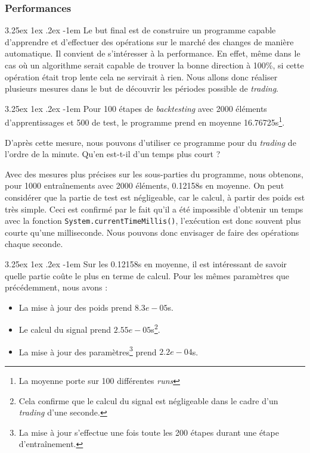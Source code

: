 \documentclass[a4paper, 11pt]{article}
\makeatletter
\renewcommand\paragraph{\@startsection{paragraph}{5}{\z@}%
  {3.25ex \@plus1ex \@minus.2ex}%
  {-1em}%
  {\normalfont\normalsize\bfseries}}
\makeatother
\begin{document}
\subsubsection{Performances}
\paragraph{}
Le but final est de construire un programme capable d'apprendre et d'effectuer des opérations sur le marché des changes de manière automatique. Il convient de s'intéresser à la performance. En effet, même dans le cas où un algorithme serait capable de trouver la bonne direction à 100\%, si cette opération était trop lente cela ne servirait à rien. Nous allons donc réaliser plusieurs mesures dans le but de découvrir les périodes possible de \textit{trading}.

\paragraph{}
Pour 100 étapes de \textit{backtesting} avec 2000 éléments d'apprentissages et 500 de test, le programme prend en moyenne 16.76725s\footnote{La moyenne porte sur 100 différentes \textit{runs}}.

D'après cette mesure,  nous pouvons d'utiliser ce programme pour du \textit{trading} de l'ordre de la minute. Qu'en est-t-il d'un temps plus court ?

Avec des mesures plus précises sur les sous-parties du programme, nous obtenons, pour 1000 entraînements avec 2000 éléments, 0.12158s en moyenne. On peut considérer que la partie de test est négligeable, car le calcul, à partir des poids est très simple. Ceci est confirmé par le fait qu'il a été impossible d'obtenir un temps avec la fonction \lstinline|System.currentTimeMillis()|, l'exécution est donc souvent plus courte qu'une milliseconde.
Nous pouvons donc envisager de faire des opérations chaque seconde.

\paragraph{}
Sur les 0.12158s en moyenne, il est intéressant de savoir quelle partie coûte le plus en terme de calcul.
Pour les mêmes paramètres que précédemment, nous avons :
\begin{itemize}
	\item La mise à jour des poids prend $8.3e-05$s.
	\item Le calcul du signal prend $2.55e-05$s\footnote{Cela confirme que le calcul du signal est négligeable dans le cadre d'un \textit{trading} d'une seconde.}.
	\item La mise à jour des paramètres\footnote{La mise à jour s'effectue une fois toute les 200 étapes durant une étape d'entraînement.} prend $2.2e-04$s.
\end{itemize}
\end{document}
